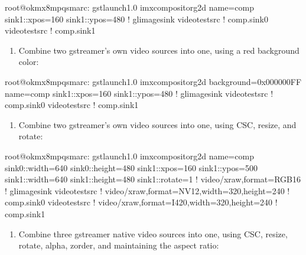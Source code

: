 \documentclass[letterpaper,10pt,openany,english]{sphinxmanual}
\begin{document}
\begin{sphinxVerbatim}[commandchars=\\\{\}]
root@ok\PYGZhy{}mx8mpq\PYGZhy{}smarc:\PYGZti{}\PYGZsh{} gst\PYGZhy{}launch\PYGZhy{}1.0 imxcompositor\PYGZus{}g2d name=comp sink\PYGZus{}1::xpos=160 sink\PYGZus{}1::ypos=480 ! glimagesink videotestsrc ! comp.sink\PYGZus{}0 videotestsrc ! comp.sink\PYGZus{}1
\end{sphinxVerbatim}
\begin{enumerate}
%
\setcounter{enumi}{1}
\item {} 
\sphinxAtStartPar
Combine two gstreamer’s own video sources into one, using a red background color:

\end{enumerate}

\begin{sphinxVerbatim}[commandchars=\\\{\}]
root@ok\PYGZhy{}mx8mpq\PYGZhy{}smarc:\PYGZti{}\PYGZsh{} gst\PYGZhy{}launch\PYGZhy{}1.0 imxcompositor\PYGZus{}g2d background=0x000000FF name=comp sink\PYGZus{}1::xpos=160 sink\PYGZus{}1::ypos=480 ! glimagesink videotestsrc ! comp.sink\PYGZus{}0 videotestsrc ! comp.sink\PYGZus{}1
\end{sphinxVerbatim}
\begin{enumerate}
%
\setcounter{enumi}{2}
\item {} 
\sphinxAtStartPar
Combine two gstreamer’s own video sources into one, using CSC, resize, and rotate:

\end{enumerate}

\begin{sphinxVerbatim}[commandchars=\\\{\}]
root@ok\PYGZhy{}mx8mpq\PYGZhy{}smarc:\PYGZti{}\PYGZsh{} gst\PYGZhy{}launch\PYGZhy{}1.0 imxcompositor\PYGZus{}g2d name=comp sink\PYGZus{}0::width=640 sink\PYGZus{}0::height=480 sink\PYGZus{}1::xpos=160 sink\PYGZus{}1::ypos=500 sink\PYGZus{}1::width=640 sink\PYGZus{}1::height=480 sink\PYGZus{}1::rotate=1 ! video/x\PYGZhy{}raw,format=RGB16 ! glimagesink videotestsrc ! video/x\PYGZhy{}raw,format=NV12,width=320,height=240 ! comp.sink\PYGZus{}0 videotestsrc ! video/x\PYGZhy{}raw,format=I420,width=320,height=240 ! comp.sink\PYGZus{}1
\end{sphinxVerbatim}
\begin{enumerate}
%
\setcounter{enumi}{3}
\item {} 
\sphinxAtStartPar
Combine three gstreamer native video sources into one, using CSC, resize, rotate, alpha, z\sphinxhyphen{}order, and maintaining the aspect ratio:

\end{enumerate}
\end{document}
